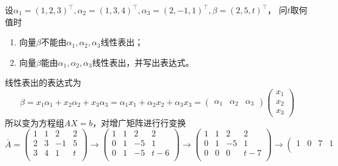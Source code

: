 \begin{example}
    设$\alpha_1 = (1,2,3)^\intercal,\alpha_2 = (1,3,4)^\intercal, \alpha_3 = (2,-1,1)^\intercal,\beta = (2,5,t)^\intercal$，
    问$t$取何值时
    \begin{enumerate}[(1)]
        \item 向量$\beta$不能由$\alpha_1,\alpha_2,\alpha_3$线性表出；
        \item 向量$\beta$能由$\alpha_1,\alpha_2,\alpha_3$线性表出，并写出表达式。
    \end{enumerate}
\end{example}
\begin{solution}
    线性表出的表达式为
    \[
        \beta = x_1\alpha_1 + x_2 \alpha_2 + x_3\alpha_3
        = \alpha_1x_1 + \alpha_2x_2 + \alpha_3x_3
        =
        \begin{pmatrix}
            \alpha_1 & \alpha_2 & \alpha_3
        \end{pmatrix}
        \begin{pmatrix}
            x_1 \\x_2\\x_3
        \end{pmatrix}
    \]
    所以变为方程组$AX=b$，对增广矩阵进行行变换
    \[
        \bar{A}=
        \left(\begin{array}{ccc|c}
                1 & 1 & 2  & 2 \\
                2 & 3 & -1 & 5 \\
                3 & 4 & 1  & t \\
            \end{array}\right)
        \longrightarrow
        \left(\begin{array}{ccc|c}
                1 & 1 & 2  & 2   \\
                0 & 1 & -5 & 1   \\
                0 & 1 & -5 & t-6 \\
            \end{array}\right)
        \longrightarrow
        \left(\begin{array}{ccc|c}
                1 & 1 & 2  & 2   \\
                0 & 1 & -5 & 1   \\
                0 & 0 & 0  & t-7 \\
            \end{array}\right)
        \longrightarrow
        \left(\begin{array}{ccc|c}
                1 & 0 & 7  & 1   \\

\end{array}\]
\end{solution}
